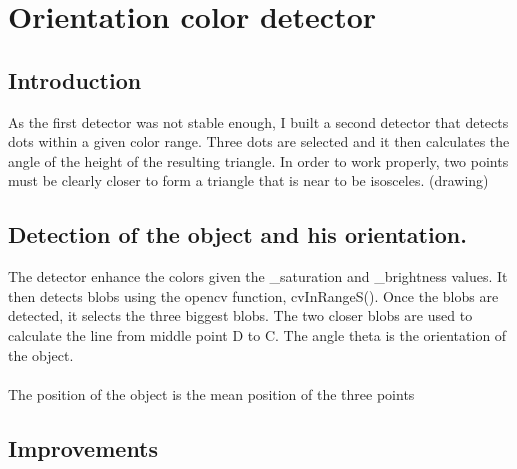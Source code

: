 \section{Orientation color detector}

 

\subsection{Introduction}


As the first detector was not stable enough, I built a second detector 
that detects dots within a given color range. Three dots are selected 
and it then calculates the angle of the height of the resulting triangle. 
In order to work properly, two points must be clearly closer to form a 
triangle that is near to be isosceles. (drawing)

\subsection{Detection of the object and his orientation.}



The detector enhance the colors given the \_saturation and \_brightness 
values. It then detects blobs using the opencv function, cvInRangeS(). 
Once the blobs are detected, it selects the three biggest blobs. The 
two closer blobs are used to calculate the line from middle point D to C. 
The angle theta is the orientation of the object.
\\
\\
The position of the object is the mean position of the three points

\subsection{Improvements}

